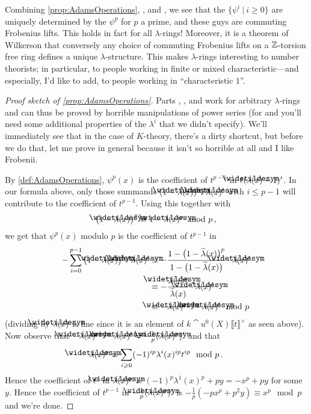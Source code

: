 Combining \cref{prop:AdamsOperations}, , and , we see that the $\{\psi^i\ |\ i\geq 0\}$ are uniquely determined by the $\psi^p$ for $p$ a prime, and these guys are commuting Frobenius lifts. This holds in fact for all $\lambda$-rings! Moreover, it is a theorem of Wilkerson that conversely any choice of commuting Frobenius lifts on a $\mathbb{Z}$-torsion free ring defines a unique $\lambda$-structure. This makes $\lambda$-rings interesting to number theorists; in particular, to people working in finite or mixed characteristic---and especially, I'd like to add, to people working in \enquote{characteristic $1$}.
\begin{proof}[Proof sketch of \cref{prop:AdamsOperations}]
	Parts , , and  work for arbitrary $\lambda$-rings and can thus be proved by horrible manipulations of power series (for  and  you'll need some additional properties of the $\lambda^i$ that we didn't specify). We'll immediately see that in the case of $K$-theory, there's a dirty shortcut, but before we do that, let me prove  in general because it isn't so horrible at all and I like Frobenii.
	
	By \cref{def:AdamsOperations}, $\psi^p(x)$ is the coefficient of $t^{p-1}$ in $\ell(\snake{\lambda}(x)-1)'$. In our formula above, only those summands $(1-\snake{\lambda}(x))^i\cdot\snake{\lambda}(x)'$ with $i\leq p-1$ will contribute to the coefficient of $t^{p-1}$. Using this together with
	\begin{equation*}
		\big(1-\snake{\lambda}(x)\big)^p\equiv 1-\snake{\lambda}(x)^p\mod p\,,
	\end{equation*}
	we get that $\psi^p(x)$ modulo $p$ is the coefficient of $t^{p-1}$ in
	\begin{align*}
		-\sum_{i=0}^{p-1}\big(1-\snake{\lambda}(x)\big)^i\cdot\snake{\lambda}(x)'&\equiv -\frac{1-\big(1-\widetilde{\lambda}(x)\big)^p}{1-\big(1-\widetilde{\lambda}(x)\big)}\cdot \snake{\lambda}(x)'\\
		&\equiv -\frac{\snake{\lambda}(x)^p}{\widetilde{\lambda}(x)}\cdot \snake{\lambda}(x)'\\
		&\equiv -\snake{\lambda}(x)^{p-1}\cdot \snake{\lambda}(x)'\mod p
	\end{align*}
	(dividing by $\snake{\lambda}(x)$ is fine since it is an element of $k\cat{u}^0(X)\llbracket t\rrbracket^\times$ as seen above). Now observe that $-\snake{\lambda}(x)^{p-1}\cdot \snake{\lambda}(x)'=-\frac 1p(\snake{\lambda}(x)^p)'$ and that
	\begin{equation*}
		\snake{\lambda}(x)^p\equiv \sum_{i\geq 0}(-1)^{ip}\lambda^i(x)^{ip}t^{ip}\mod p\,.
	\end{equation*}
	Hence the coefficient of $t^p$ in $\snake{\lambda}(x)^p$ is $(-1)^p\lambda^1(x)^p+py=-x^p+py$ for some $y$. Hence the coefficient of $t^{p-1}$ in $-\frac 1p(\snake{\lambda}(x)^p)'$ is $-\frac 1p(-px^p+p^2y)\equiv x^p\mod p$ and we're done.
	

\end{proof}
